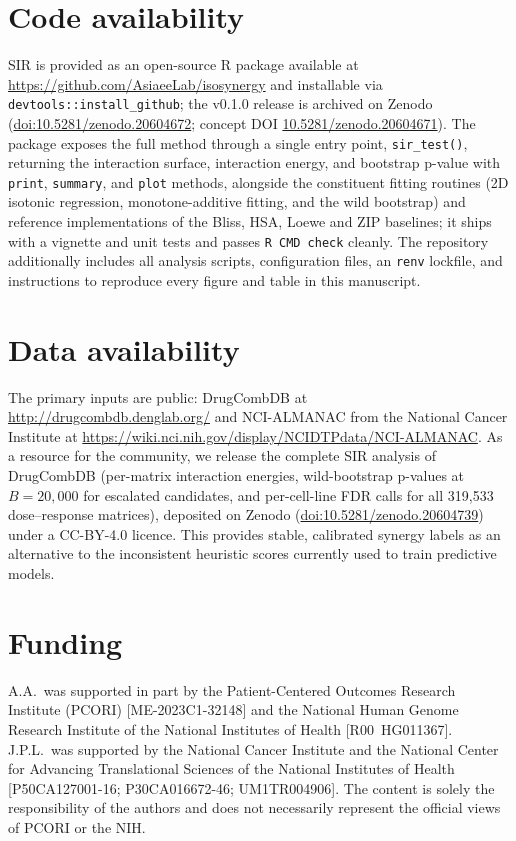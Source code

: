 \documentclass[unnumsec,webpdf,contemporary,large]{oup-authoring-template}
\begin{document}
\section*{Code availability}
SIR is provided as an open-source R package available at \url{https://github.com/AsiaeeLab/isosynergy} and installable via \texttt{devtools::install\_github}; the v0.1.0 release is archived on Zenodo (\href{https://doi.org/10.5281/zenodo.20604672}{doi:10.5281/zenodo.20604672}; concept DOI \href{https://doi.org/10.5281/zenodo.20604671}{10.5281/zenodo.20604671}).
The package exposes the full method through a single entry point, \texttt{sir\_test()}, returning the interaction surface, interaction energy, and bootstrap p-value with \texttt{print}, \texttt{summary}, and \texttt{plot} methods, alongside the constituent fitting routines (2D isotonic regression, monotone-additive fitting, and the wild bootstrap) and reference implementations of the Bliss, HSA, Loewe and ZIP baselines; it ships with a vignette and unit tests and passes \texttt{R~CMD~check} cleanly.
The repository additionally includes all analysis scripts, configuration files, an \texttt{renv} lockfile, and instructions to reproduce every figure and table in this manuscript.

\section*{Data availability}
The primary inputs are public: DrugCombDB \cite{DrugCombDB2020} at \url{http://drugcombdb.denglab.org/} and NCI-ALMANAC from the National Cancer Institute at \url{https://wiki.nci.nih.gov/display/NCIDTPdata/NCI-ALMANAC}.
As a resource for the community, we release the complete SIR analysis of DrugCombDB (per-matrix interaction energies, wild-bootstrap p-values at $B=20{,}000$ for escalated candidates, and per-cell-line FDR calls for all 319{,}533 dose--response matrices), deposited on Zenodo (\href{https://doi.org/10.5281/zenodo.20604739}{doi:10.5281/zenodo.20604739}) under a CC-BY-4.0 licence.
This provides stable, calibrated synergy labels as an alternative to the inconsistent heuristic scores currently used to train predictive models.

\section*{Funding}
A.A.\ was supported in part by the Patient-Centered Outcomes Research Institute (PCORI) [ME-2023C1-32148] and the National Human Genome Research Institute of the National Institutes of Health [R00~HG011367]. J.P.L.\ was supported by the National Cancer Institute and the National Center for Advancing Translational Sciences of the National Institutes of Health [P50CA127001-16; P30CA016672-46; UM1TR004906]. The content is solely the responsibility of the authors and does not necessarily represent the official views of PCORI or the NIH.
\end{document}
